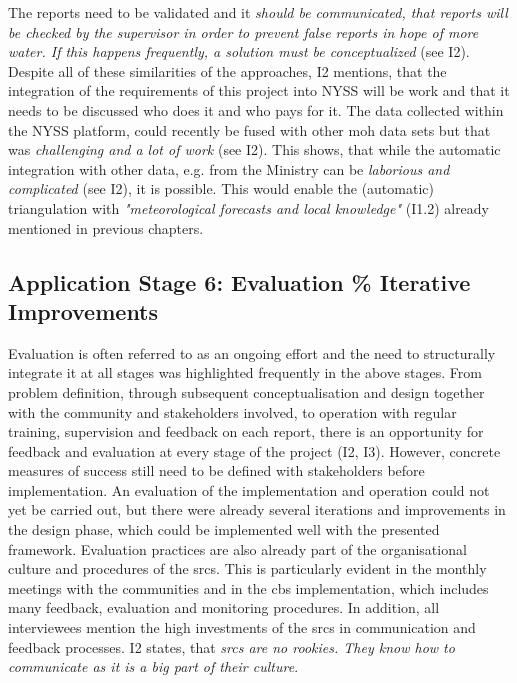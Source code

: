 The reports need to be validated and it \textit{should be communicated, that reports will be checked by the supervisor in order to prevent false reports in hope of more water. If this happens frequently, a solution must be conceptualized} (see I2). Despite all of these similarities of the approaches, I2 mentions, that the integration of the requirements of this project into NYSS will be work and that it needs to be discussed who does it and who pays for it.\newline
The data collected within the NYSS platform, could recently be fused with other \acrshort{moh} data sets but that was \textit{challenging and a lot of work} (see I2). This shows, that while the automatic integration with other data, e.g. from the Ministry can be \textit{laborious and complicated} (see I2), it is possible. This would enable the (automatic) triangulation with \textit{"meteorological forecasts and local knowledge"} (I1.2) already mentioned in previous chapters.

\subsection{Application Stage 6: Evaluation \% Iterative Improvements}

Evaluation is often referred to as an ongoing effort and the need to structurally integrate it at all stages was highlighted frequently in the above stages. From problem definition, through subsequent conceptualisation and design together with the community and stakeholders involved, to operation with regular training, supervision and feedback on each report, there is an opportunity for feedback and evaluation at every stage of the project (I2, I3). However, concrete measures of success still need to be defined with stakeholders before implementation. An evaluation of the implementation and operation could not yet be carried out, but there were already several iterations and improvements in the design phase, which could be implemented well with the presented framework.\newline
Evaluation practices are also already part of the organisational culture and procedures of the \acrshort{srcs}. This is particularly evident in the monthly meetings with the communities and in the \acrshort{cbs} implementation, which includes many feedback, evaluation and monitoring procedures. In addition, all interviewees mention the high investments of the \acrshort{srcs} in communication and feedback processes. I2 states, that \textit{\acrshort{srcs} are no rookies. They know how to communicate as it is a big part of their culture}.


